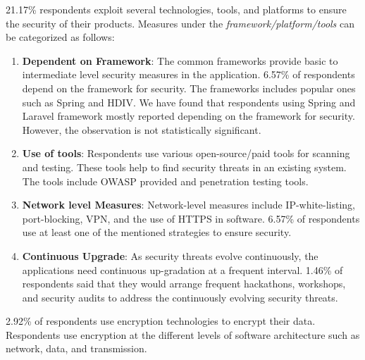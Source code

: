21.17\% respondents exploit several technologies, tools, and platforms to ensure the security of their products. Measures under the \emph{framework/platform/tools} can be categorized as follows:
\begin{enumerate}[label=(\alph*)]

     \item \textbf{Dependent on Framework}: The common frameworks provide basic to intermediate level security measures in the application. 6.57\% of respondents depend on the framework for security. The frameworks includes popular ones such as Spring and  HDIV. We have found that respondents using Spring and Laravel framework mostly reported depending on the framework for security. However, the observation is not statistically significant.
    
    \item \textbf{Use of tools}: Respondents use various open-source/paid tools for scanning and testing. These tools help to find security threats in an existing system. The tools include OWASP provided and  penetration testing tools.
    
    \item \textbf{Network level Measures}: Network-level measures include IP-white-listing, port-blocking, VPN, and the use of HTTPS  in software. 6.57\% of respondents use at least one of the mentioned strategies to ensure security.

    \item \textbf{Continuous Upgrade}: As security threats evolve continuously, the applications need continuous up-gradation at a frequent interval. 1.46\% of respondents said that they would arrange frequent hackathons, workshops, and security audits to address the continuously evolving security threats.

\end{enumerate}

2.92\% of respondents use encryption technologies to encrypt their data. Respondents use encryption at the different levels of software architecture such as network, data, and transmission.


